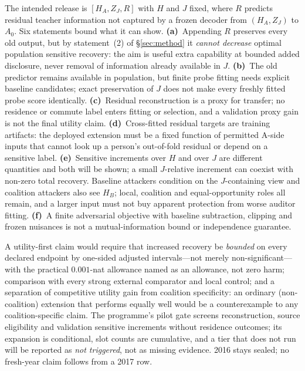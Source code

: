 \documentclass[10pt]{article}
\begin{document}
The intended release is $[H_A,Z_J,R]$ with $H$ and $J$ fixed, where $R$ predicts residual teacher information
not captured by a frozen decoder from $(H_A,Z_J)$ to $A_0$. Six statements bound what it can show.
\textbf{(a)}~Appending $R$ preserves every old output, but by statement~(2) of \S\ref{sec:method} it
\emph{cannot decrease} optimal population sensitive recovery: the aim is useful extra capability at bounded
added disclosure, never removal of information already available in $J$. \textbf{(b)}~The old predictor
remains available in population, but finite probe fitting needs explicit baseline candidates; exact
preservation of $J$ does not make every freshly fitted probe score identically. \textbf{(c)}~Residual
reconstruction is a proxy for transfer; no residence or commute label enters fitting or selection, and a
validation proxy gain is not the final utility claim. \textbf{(d)}~Cross-fitted residual targets are training
artifacts: the deployed extension must be a fixed function of permitted A-side inputs that cannot look up a
person's out-of-fold residual or depend on a sensitive label. \textbf{(e)}~Sensitive increments over $H$ and
over $J$ are different quantities and both will be shown; a small $J$-relative increment can coexist with
non-zero total recovery. Baseline attackers condition on the $J$-containing view and coalition attackers
also see $H_B$; local, coalition and equal-opportunity roles all remain, and a larger input must not buy
apparent protection from worse auditor fitting. \textbf{(f)}~A finite adversarial objective with baseline
subtraction, clipping and frozen nuisances is not a mutual-information bound or independence guarantee.

A utility-first claim would require that increased recovery be \emph{bounded} on every declared endpoint by
one-sided adjusted intervals---not merely non-significant---with the practical $0.001$-nat allowance named as
an allowance, not zero harm; comparison with every strong external comparator and local control; and a
separation of competitive utility gain from coalition specificity: an ordinary (non-coalition) extension
that performs equally well would be a counterexample to any coalition-specific claim. The programme's pilot
gate screens reconstruction, source eligibility and validation sensitive increments without residence
outcomes; its expansion is conditional, slot counts are cumulative, and a tier that does not run will be
reported as \emph{not triggered}, not as missing evidence. 2016 stays sealed; no fresh-year claim follows from
a 2017 row.
\end{document}
